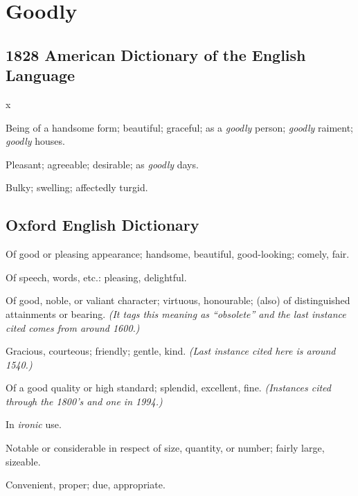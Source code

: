 \section{Goodly}
	\label{GOODLY}
	

\subsection{1828 American Dictionary of the English Language} %
	\label{GOODLY-1828}x

	\begin{compactitem}
		\item Being of a handsome form; beautiful; graceful; as a \textit{goodly} person; \textit{goodly} raiment; \textit{goodly} houses.
		\item Pleasant; agreeable; desirable; as \textit{goodly} days.
		\item Bulky; swelling; affectedly turgid.
	\end{compactitem}

\subsection{Oxford English Dictionary} %
	\label{GOODLY-OED}

	\begin{compactitem}
		\item[1a] Of good or pleasing appearance; handsome, beautiful, good-looking; comely, fair.
		\item[1b] Of speech, words, etc.: pleasing, delightful.
		\item[2] Of good, noble, or valiant character; virtuous, honourable; (also) of distinguished attainments or bearing. \textit{(It tags this meaning as ``obsolete'' and the last instance cited comes from around 1600.)}
		\item[3] Gracious, courteous; friendly; gentle, kind. \textit{(Last instance cited here is around 1540.)}
		\item[4a] Of a good quality or high standard; splendid, excellent, fine. \textit{(Instances cited through the 1800's and one in 1994.)}
		\item[4b] In \textit{ironic} use.
		\item[5] Notable or considerable in respect of size, quantity, or number; fairly large, sizeable.
		\item[6] Convenient, proper; due, appropriate.
	\end{compactitem}

